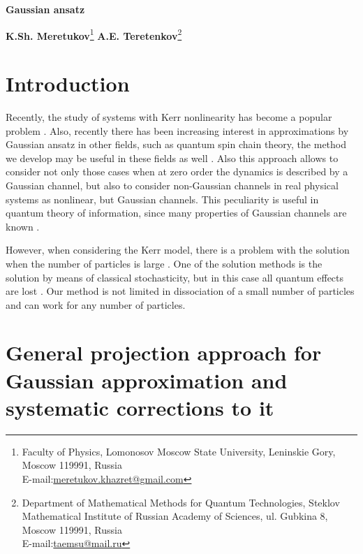 \documentclass[12pt]{article}
\theoremstyle{definition}
\begin{document}
		\begin{center}
		\Large
		\textbf{Gaussian ansatz}
		
		\large 
		\textbf{K.Sh. Meretukov}\footnote{Faculty of Physics, Lomonosov Moscow State University, Leninskie Gory, Moscow 119991, Russia\\
			E-mail:\href{mailto:meretukov.khazret@gmail.com}{meretukov.khazret@gmail.com}}
		\textbf{A.E. Teretenkov}\footnote{Department of Mathematical Methods for Quantum Technologies, Steklov Mathematical Institute of Russian Academy of Sciences, ul. Gubkina 8, Moscow 119991, Russia\\ E-mail:\href{mailto:taemsu@mail.ru}{taemsu@mail.ru}}
		\\[1mm]
	\end{center}
	
	\footnotesize
	
	\normalsize
	
	\section{\label{sec:introduction}Introduction}
	
	Recently, the study of systems with Kerr nonlinearity has become a popular problem \cite{KerrIntr}. Also, recently there has been increasing interest in approximations by Gaussian ansatz in other fields, such as quantum spin chain theory, the method we develop may be useful in these fields as well \cite{GaussState}. Also this approach allows to consider not only those cases when at zero order the dynamics is described by a Gaussian channel, but also to consider non-Gaussian channels in real physical systems as nonlinear, but Gaussian channels. This peculiarity is useful in quantum theory of information, since many properties of Gaussian channels are known \cite{Kholevo}.
	
	However, when considering the Kerr model, there is a problem with the solution when the number of particles is large \cite{MaslovN}. One of the solution methods is the solution by means of classical stochasticity, but in this case all quantum effects are lost \cite{MaslovSolve}. Our method is not limited in dissociation of a small number of particles and can work for any number of particles.
	
	\section{\label{sec:GeneralApproch}General projection approach for Gaussian approximation and systematic corrections to it}
	
\end{document}
